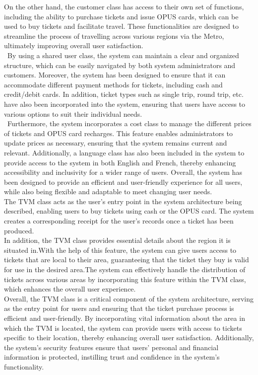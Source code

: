 \documentclass{article}
\begin{document}
{\newline
On the other hand, the customer class has access to their own set of functions, including the ability to purchase tickets and issue OPUS cards, which can be used to buy tickets and facilitate travel. These functionalities are designed to streamline the process of travelling across various regions via the Metro, ultimately improving overall user satisfaction.
\newline
\\\
By using a shared user class, the system can maintain a clear and organized structure, which can be easily navigated by both system administrators and customers. Moreover, the system has been designed to ensure that it can accommodate different payment methods for tickets, including cash and credit/debit cards. In addition, ticket types such as single trip, round trip, etc. have also been incorporated into the system, ensuring that users have access to various options to suit their individual needs.
\newline
\\\
Furthermore, the system incorporates a cost class to manage the different prices of tickets and OPUS card recharges. This feature enables administrators to update prices as necessary, ensuring that the system remains current and relevant. Additionally, a language class has also been included in the system to provide access to the system in both English and French, thereby enhancing accessibility and inclusivity for a wider range of users. Overall, the system has been designed to provide an efficient and user-friendly experience for all users, while also being flexible and adaptable to meet changing user needs.
\newline
\\
The TVM class acts as the user's entry point in the system architecture being described, enabling users to buy tickets using cash or the OPUS card.
The system creates a corresponding receipt for the user's records once a ticket has been produced.
\newline
\\
In addition, the TVM class provides essential details about the region it is situated in.With the help of this feature, the system can give users access to tickets that are local to their area, guaranteeing that the ticket they buy is valid for use in the desired area.The system can effectively handle the distribution of tickets across various areas by incorporating this feature within the TVM class, which enhances the overall user experience. 
\newline
\\
Overall, the TVM class is a critical component of the system architecture, serving as the entry point for users and ensuring that the ticket purchase process is efficient and user-friendly. By incorporating vital information about the area in which the TVM is located, the system can provide users with access to tickets specific to their location, thereby enhancing overall user satisfaction. Additionally, the system's security features ensure that users' personal and financial information is protected, instilling trust and confidence in the system's functionality.
}
\end{document}
